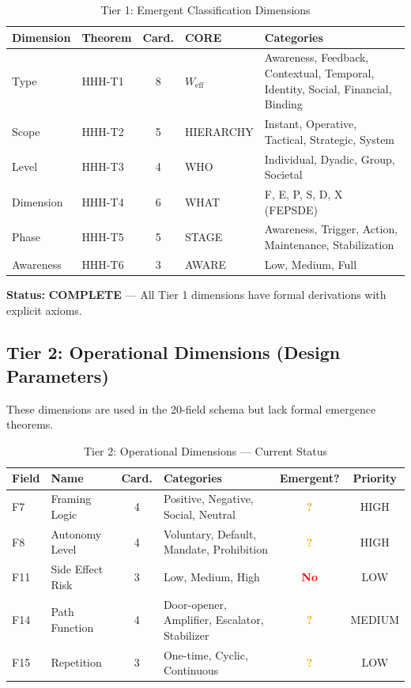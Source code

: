\begin{table}[htbp]
\centering
\caption{Tier 1: Emergent Classification Dimensions}
\label{tab:hhh-tier1}
\renewcommand{\arraystretch}{1.3}
\small
\begin{tabular}{@{}llclp{4cm}@{}}
\toprule
\textbf{Dimension} & \textbf{Theorem} & \textbf{Card.} & \textbf{CORE} & \textbf{Categories} \\
\midrule
Type & HHH-T1 & 8 & $W_{\text{eff}}$ & Awareness, Feedback, Contextual, Temporal, Identity, Social, Financial, Binding \\
Scope & HHH-T2 & 5 & HIERARCHY & Instant, Operative, Tactical, Strategic, System \\
Level & HHH-T3 & 4 & WHO & Individual, Dyadic, Group, Societal \\
Dimension & HHH-T4 & 6 & WHAT & F, E, P, S, D, X (FEPSDE) \\
Phase & HHH-T5 & 5 & STAGE & Awareness, Trigger, Action, Maintenance, Stabilization \\
Awareness & HHH-T6 & 3 & AWARE & Low, Medium, Full \\
\bottomrule
\end{tabular}
\end{table}

\textbf{Status:} \textcolor{green!60!black}{\textbf{COMPLETE}} --- All Tier 1 dimensions have formal derivations with explicit axioms.

\subsection{Tier 2: Operational Dimensions (Design Parameters)}

These dimensions are used in the 20-field schema but lack formal emergence theorems.

\begin{table}[htbp]
\centering
\caption{Tier 2: Operational Dimensions --- Current Status}
\label{tab:hhh-tier2}
\renewcommand{\arraystretch}{1.3}
\small
\begin{tabular}{@{}llclcc@{}}
\toprule
\textbf{Field} & \textbf{Name} & \textbf{Card.} & \textbf{Categories} & \textbf{Emergent?} & \textbf{Priority} \\
\midrule
F7 & Framing Logic & 4 & Positive, Negative, Social, Neutral & \textcolor{orange}{\textbf{?}} & HIGH \\
F8 & Autonomy Level & 4 & Voluntary, Default, Mandate, Prohibition & \textcolor{orange}{\textbf{?}} & HIGH \\
F11 & Side Effect Risk & 3 & Low, Medium, High & \textcolor{red}{\textbf{No}} & LOW \\
F14 & Path Function & 4 & Door-opener, Amplifier, Escalator, Stabilizer & \textcolor{orange}{\textbf{?}} & MEDIUM \\
F15 & Repetition & 3 & One-time, Cyclic, Continuous & \textcolor{orange}{\textbf{?}} & LOW \\
\bottomrule
\end{tabular}
\end{table}

